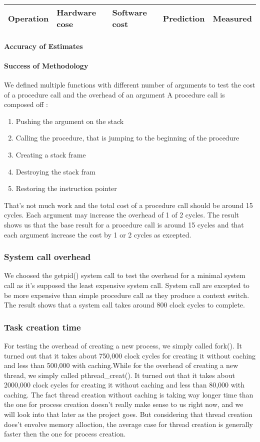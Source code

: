 \begin{tabular}{| l | l | l | l | l |}
\hline
Operation & Hardware cose & Software cost & Prediction & Measured \\
\hline
\end{tabular}
\paragraph{Accuracy of Estimates}
\paragraph{Success of Methodology}
We defined multiple functions with different number of arguments to test the
cost of a procedure call and the overhead of an argument
A procedure call is composed off :
\begin{enumerate}
\item Pushing the argument on the stack
\item Calling the procedure, that is jumping to the beginning of the procedure
\item Creating a stack frame
\item Destroying the stack fram
\item Restoring the instruction pointer
\end{enumerate}

That's not much work and the total cost of a procedure call should be around 15
cycles. Each argument may increase the overhead of 1 of 2 cycles.
The result shows us that the base result for a procedure call is around 15
cycles and that each argument increase the cost by 1 or 2 cycles as excepted.

\subsubsection{System call overhead}
We choosed the getpid() system call to test the overhead for a minimal system
call as it's supposed the least expensive system call.
System call are excepted to be more expensive than simple procedure call as they
produce a context switch.
The result shows that a system call takes around 800 clock cycles to complete.

\subsubsection{Task creation time}
For testing the overhead of creating a new process, we simply called fork(). It turned out that it takes about 750,000 clock cycles for creating it without caching and less than 500,000 with caching.While for the overhead of creating a new thread, we simply called pthread\_creat(). It turned out that it takes about 2000,000 clock cycles for creating it without caching and less than 80,000 with caching.
The fact thread creation without caching is taking way longer time than the one for process creation doesn't really make sense to us right now, and we will look into that later as the project goes. But considering that thread creation does't envolve memory alloction, the average case for thread creation is generally faster then the one for process creation.


